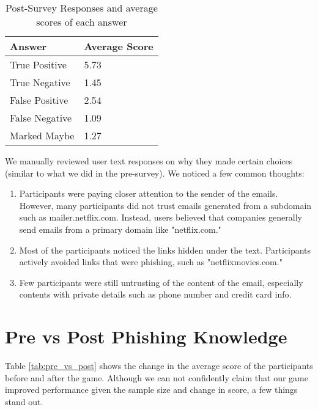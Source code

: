 \begin{table}[!ht]
    \centering
    \begin{tabular}{l l}
        \hline
        \textbf{Answer} & \textbf{Average Score} \\
        \hline
        True Positive   & 5.73                   \\
        True Negative   & 1.45                   \\
        False Positive  & 2.54                   \\
        False Negative  & 1.09                   \\
        Marked Maybe    & 1.27                   \\
    \end{tabular}
    \caption{Post-Survey Responses and average scores of each answer}
    \label{tab:post_survey_responses}
\end{table}

We manually reviewed user text responses on why they made certain choices (similar to what we did in the pre-survey). We noticed a few common thoughts:

\begin{enumerate}
    \item Participants were paying closer attention to the sender of the emails. However, many participants did not trust emails generated from a subdomain such as mailer.netflix.com. Instead, users believed that companies generally send emails from a primary domain like "netflix.com."
    \item Most of the participants noticed the links hidden under the text. Participants actively avoided links that were phishing, such as "netflixmovies.com."
    \item Few participants were still untrusting of the content of the email, especially contents with private details such as phone number and credit card info.
\end{enumerate}

\section{Pre vs Post Phishing Knowledge}
Table \ref{tab:pre_vs_post} shows the change in the average score of the participants before and after the game. Although we can not confidently claim that our game improved performance given the sample size and change in score, a few things stand out.

